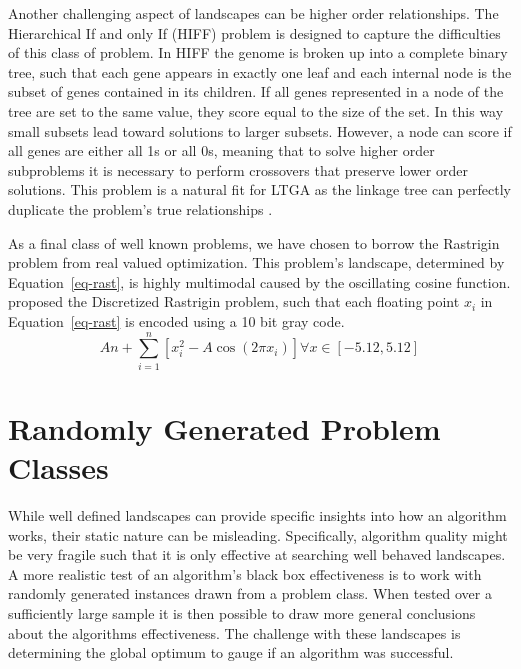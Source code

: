 Another challenging aspect of landscapes can be higher order relationships. The Hierarchical If
and only If (HIFF) problem is designed to capture the difficulties of this class of problem.
In HIFF the genome is broken up into a complete binary tree, such that each gene appears in exactly one
leaf and each internal node is the subset of genes contained in its children. If all genes represented
in a node of the tree are set to the same value, they score equal to the size of the set. In this way
small subsets lead toward solutions to larger subsets. However, a node can score if all genes are either
all 1s or all 0s, meaning that to solve higher order subproblems it is necessary to perform crossovers
that preserve lower order solutions. This problem is a natural fit for LTGA as the linkage tree can
perfectly duplicate the problem's true relationships \citep{thierens:2013:ltgahiff}.

As a final class of well known problems, we have chosen to borrow the Rastrigin problem from real valued
optimization. This problem's landscape, determined by Equation~\ref{eq-rast}, is highly multimodal caused by
the oscillating cosine function. \cite{goldman:2014:p3} proposed the Discretized Rastrigin problem, such
that each floating point $x_i$ in Equation~\ref{eq-rast} is encoded using a 10 bit gray code.
\begin{equation}
  An + \sum_{i=1}^{n}\left [ x_i^2-A\cos (2\pi x_i) \right ] \forall x\in [-5.12,5.12]
  \label{eq-rast}
\end{equation}

\section{Randomly Generated Problem Classes}
While well defined landscapes can provide specific insights into how an algorithm works,
their static nature can be misleading. Specifically, algorithm quality might
be very fragile such that it is only effective at searching well behaved landscapes. A more realistic
test of an algorithm's black box effectiveness is to work with randomly generated instances
drawn from a problem class. When tested over a sufficiently large sample it is then possible
to draw more general conclusions about the algorithms effectiveness. The challenge with these
landscapes is determining the global optimum to gauge if an algorithm was successful.

